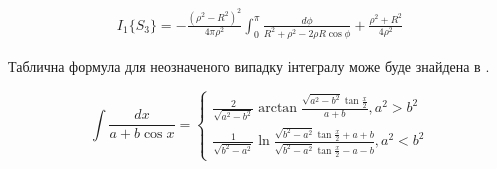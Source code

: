 
\begin{equation*} \begin{aligned}
I_{1} \{ S_3 \} = - \frac{\left( \rho^2 - R^2 \right)^2}{4 \pi \rho^2} 
\int_{0}^{\pi} \frac{d \phi}{R^2 + \rho^2 - 2 \rho R \cos \phi} + 
\frac{\rho^2 + R^2}{4 \rho^2}
\end{aligned} \end{equation*}

Таблична формула для неозначеного випадку інтегралу може буде знайдена в 
\cite[ст. 181]{imp:ElementFunc1983}.

\begin{equation} \label{eq:caseTableIntegral}
\int \frac{d x}{a + b \cos{x}} = \begin{cases}
\frac{2}{\sqrt{a^2-b^2}} \arctan \frac{\sqrt{a^2-b^2} \tan \frac{x}{2}}
{a + b}, a^2 > b^2 \\
\frac{1}{\sqrt{b^2-a^2}} \ln 
\frac{\sqrt{b^2-a^2} \tan \frac{x}{2} + a + b}
{\sqrt{b^2-a^2} \tan \frac{x}{2} - a - b}, a^2 < b^2
\end{cases}
\end{equation}

